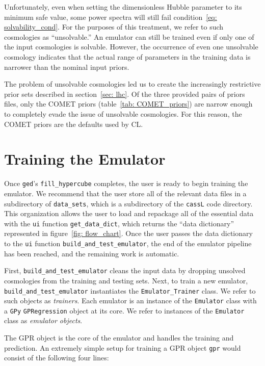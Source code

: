 Unfortunately, even when setting the dimensionless Hubble parameter to its
minimum safe value, some power spectra will still fail
condition~\ref{eq: solvability_cond}.
For the purposes of this treatment, we refer to such cosmologies as
``unsolvable.'' An emulator can still be trained even if only one of the input 
cosmologies is solvable. However, the occurrence of even one
unsolvable cosmology indicates that the actual range of parameters in the
training data is narrower than the nominal input priors. 

The problem of unsolvable cosmologies led us to create the
increasingly restrictive prior sets described in
section~\ref{sec: lhc}.
Of the three provided pairs of priors files, only the COMET priors
(table~\ref{tab: COMET_priors}) are narrow enough to completely evade the 
issue of unsolvable cosmologies. For this reason, the COMET priors are the
defaults used by CL.


\section{Training the Emulator}
\label{sec: train_emu}


Once \texttt{ged}'s \verb|fill_hypercube| completes, the user is ready to
begin training the emulator. We recommend that the user store all of the
relevant data files in a subdirectory of \verb|data_sets|, which is a
subdirectory of the \texttt{cassL} code directory. This organization
allows the user to load and repackage all of the essential data with the
\texttt{ui} function \verb|get_data_dict|, which returns the
``data dictionary'' represented in figure~\ref{fig: flow_chart}.
Once the user passes the data dictionary to the \texttt{ui} function
\verb|build_and_test_emulator|, the end of the emulator pipeline has been 
reached, and the remaining work is automatic.

First, \verb|build_and_test_emulator| cleans the input data by dropping
unsolved cosmologies from the training and testing sets. Next, to train a new 
emulator, \\
\verb|build_and_test_emulator| instantiates the
\verb|Emulator_Trainer| class. We refer to such objects as \textit{trainers}.
Each emulator is an instance of
the \texttt{Emulator} class with a \texttt{GPy}
\texttt{GPRegression} object at its core. We 
refer to instances of the \texttt{Emulator} class as \textit{emulator 
objects}.

The GPR object is the core of the emulator and handles the training
and prediction. An extremely simple setup for training a GPR object
\texttt{gpr} would consist of the following four lines:

